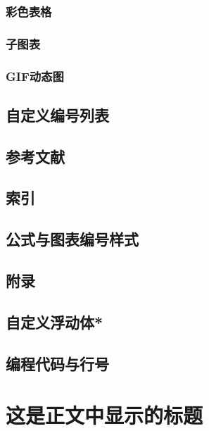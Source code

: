 \documentclass{ctexart}
\begin{document}
        \subsubsection{彩色表格}
        \subsubsection{子图表}
        \subsubsection{GIF动态图}
    \subsection{自定义编号列表}
    \subsection{参考文献}
    \subsection{索引}
    \subsection{公式与图表编号样式}
    \subsection{附录}
    \subsection{自定义浮动体*}
    \subsection{编程代码与行号}



\section[这是目录中显示的标题]{这是正文中显示的标题}
\end{document}
